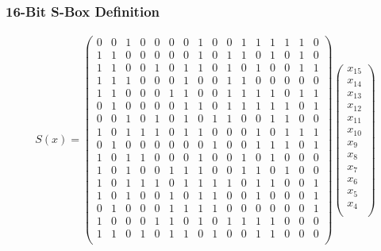 \documentclass[10pt]{beamer}
\begin{document}
\begin{frame}
	\frametitle{16-Bit S-Box Definition}
\small
\begin{align*}
S(x) =  
\begin{pmatrix}
0 & 0 & 1 & 0 & 0 & 0 & 0 & 1 & 0 & 0 & 1 & 1 & 1 & 1 & 1 & 0 \\
1 & 1 & 0 & 0 & 0 & 0 & 0 & 1 & 0 & 1 & 1 & 0 & 1 & 0 & 1 & 0 \\
1 & 1 & 0 & 0 & 1 & 0 & 1 & 1 & 0 & 1 & 0 & 1 & 0 & 0 & 1 & 1 \\
1 & 1 & 1 & 0 & 0 & 0 & 1 & 0 & 0 & 1 & 1 & 0 & 0 & 0 & 0 & 0 \\
1 & 1 & 0 & 0 & 0 & 1 & 1 & 0 & 0 & 1 & 1 & 1 & 1 & 0 & 1 & 1 \\
0 & 1 & 0 & 0 & 0 & 0 & 1 & 1 & 0 & 1 & 1 & 1 & 1 & 1 & 0 & 1 \\
0 & 0 & 1 & 0 & 1 & 0 & 1 & 0 & 1 & 1 & 0 & 0 & 1 & 1 & 0 & 0 \\
1 & 0 & 1 & 1 & 1 & 0 & 1 & 1 & 0 & 0 & 0 & 1 & 0 & 1 & 1 & 1 \\
0 & 1 & 0 & 0 & 0 & 0 & 0 & 0 & 1 & 0 & 0 & 1 & 1 & 1 & 0 & 1 \\
1 & 0 & 1 & 1 & 0 & 0 & 0 & 1 & 0 & 0 & 1 & 0 & 1 & 0 & 0 & 0 \\
1 & 0 & 1 & 0 & 0 & 1 & 1 & 1 & 0 & 0 & 1 & 1 & 0 & 1 & 0 & 0 \\
1 & 0 & 1 & 1 & 1 & 0 & 1 & 1 & 1 & 1 & 0 & 1 & 1 & 0 & 0 & 1 \\
1 & 0 & 1 & 0 & 0 & 1 & 0 & 1 & 1 & 0 & 0 & 1 & 0 & 0 & 0 & 1 \\
0 & 1 & 0 & 0 & 0 & 1 & 1 & 1 & 1 & 0 & 0 & 0 & 0 & 0 & 0 & 1 \\
1 & 0 & 0 & 0 & 1 & 1 & 0 & 1 & 0 & 1 & 1 & 1 & 1 & 0 & 0 & 0 \\
1 & 1 & 0 & 1 & 0 & 1 & 1 & 0 & 1 & 0 & 0 & 1 & 1 & 0 & 0 & 0 \\
\end{pmatrix}
\begin{pmatrix}
x_{15} \\
x_{14} \\
x_{13} \\
x_{12} \\
x_{11} \\
x_{10} \\
x_{9} \\
x_{8} \\
x_{7} \\
x_{6} \\
x_{5} \\
x_{4} \\

\end{pmatrix}
\end{align*}
\end{frame}
\end{document}
